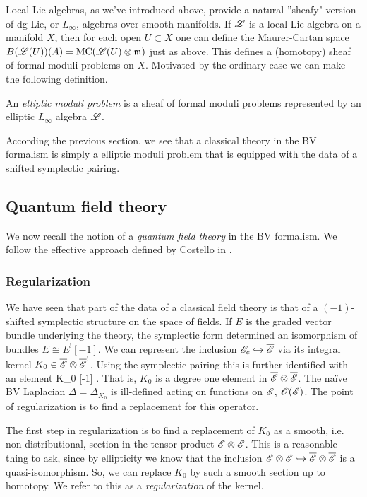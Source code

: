 Local Lie algebras, as we've introduced above, provide a natural ''sheafy" version of dg Lie, or $L_\infty$, algebras over smooth manifolds. 
If $\mathscr L$ is a local Lie algebra on a manifold $X$, then for each open $U \subset X$ one can define the Maurer-Cartan space $B(\mathscr L(U))(A) = {\rm MC}(\mathscr L(U) \otimes {\mathfrak m})$ just as above.
This defines a (homotopy) sheaf of formal moduli problems on $X$. 
Motivated by the ordinary case we can make the following definition.

\begin{dfn} 
An {\em elliptic moduli problem} is a sheaf of formal moduli problems represented by an elliptic $L_\infty$ algebra $\mathscr L$. 
\end{dfn}

According the previous section, we see that a classical theory in the BV formalism is simply a elliptic moduli problem that is equipped with the data of a shifted symplectic pairing. 

\subsection{Quantum field theory}

We now recall the notion of a {\em quantum field theory} in the BV formalism.
We follow the effective approach defined by Costello in \cite{CostelloRenormalization}.

\subsubsection{Regularization}

We have seen that part of the data of a classical field theory is that of a $(-1)$-shifted symplectic structure on the space of fields. 
If $E$ is the graded vector bundle underlying the theory, the symplectic form determined an isomorphism of bundles $E \cong E^![-1]$. 
We can represent the inclusion $\mathscr E_c \hookrightarrow \overline{\mathscr E}$ via its integral kernel $K_0 \in \overline{\mathscr E} \otimes \overline{\mathscr E}^!$. 
Using the symplectic pairing this is further identified with an element 
\ben
K_0 \in \Bar{\sE} \tensor \Bar{\sE} [-1] .
\een
That is, $K_0$ is a degree one element in $\overline{\mathscr E} \otimes \overline{\mathscr E}$.
The na\"{i}ve BV Laplacian $\Delta = \Delta_{K_0}$ is ill-defined acting on functions on $\mathscr E$, $\mathscr O(\mathscr E)$. 
The point of regularization is to find a replacement for this operator.

The first step in regularization is to find a replacement of $K_0$ as a smooth, i.e. non-distributional, section in the tensor product $\mathscr E \otimes \mathscr E$. 
This is a reasonable thing to ask, since by ellipticity we know that the inclusion $\mathscr E \otimes \mathscr E \hookrightarrow \overline{\mathscr E} \otimes \overline{\mathscr E}$ is a quasi-isomorphism. 
So, we can replace $K_0$ by such a smooth section up to homotopy.
We refer to this as a {\em regularization} of the kernel.

